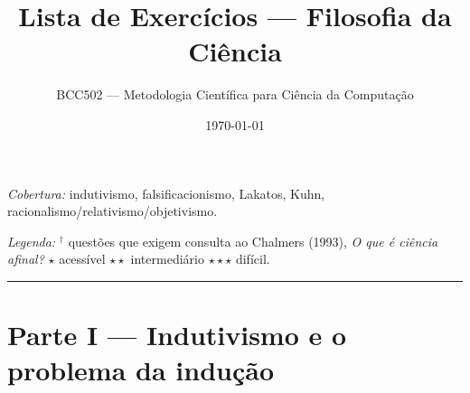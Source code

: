 \documentclass[10pt,a4paper]{extarticle}
\title{Lista de Exercícios --- Filosofia da Ciência}
\author{BCC502 --- Metodologia Científica para Ciência da Computação}
\date{\today}
\newcommand{\livro}{\textcolor{notice}{$^{\dagger}$}}
\newcommand{\difi}{$\star$}
\newcommand{\difii}{$\star\star$}
\newcommand{\difiii}{$\star\star\star$}
\begin{document}
\maketitle

\noindent\textit{Cobertura:} indutivismo, falsificacionismo, Lakatos, Kuhn, racionalismo/relativismo/objetivismo.

\noindent\textit{Legenda:} \livro{} questões que exigem consulta ao Chalmers (1993), \emph{O que é ciência afinal?} \quad
\difi{} acessível \quad \difii{} intermediário \quad \difiii{} difícil.

\vspace{0.3cm}
\hrule
\vspace{0.3cm}

\section*{Parte I --- Indutivismo e o problema da indução}
\end{document}
